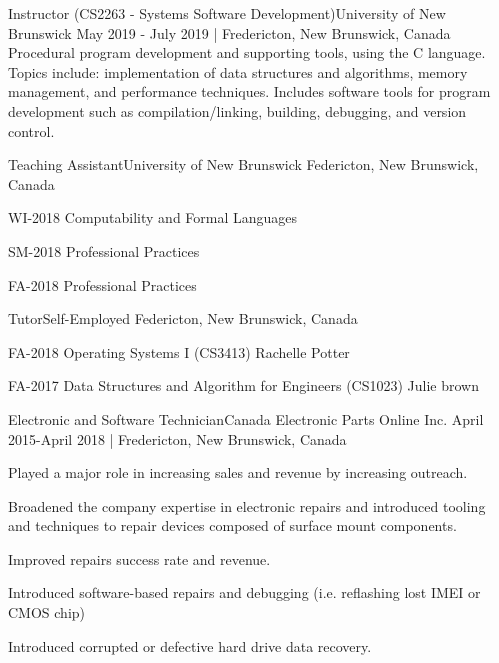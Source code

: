 \documentclass[english,letterpaper,12pt]{deedy-resume-openfont}
\begin{document}




    \employement%
        {Instructor (CS2263 - Systems Software Development)}{University of New Brunswick}
        {May 2019 - July 2019 | Fredericton, New Brunswick, Canada}{%
        Procedural program development and supporting tools, using the C language. 
        Topics include: implementation of data structures and algorithms, memory management, and performance techniques. 
        Includes software tools for program development such as compilation/linking, building, debugging, and version control.
        }

    \employement%
        {Teaching Assistant}{University of New Brunswick}
        {Federicton, New Brunswick, Canada}{%
        \begin{tightemize}
        \item WI-2018 Computability and Formal Languages
        \item SM-2018 Professional Practices
        \item FA-2018 Professional Practices
        \end{tightemize}
        }

    \employement%
        {Tutor}{Self-Employed}
        {Federicton, New Brunswick, Canada}{%
        \begin{tightemize}
        \item FA-2018 Operating Systems I (CS3413) Rachelle Potter
        \item FA-2017 Data Structures and Algorithm for Engineers (CS1023) Julie brown
        \end{tightemize}
        }

    \employement%
        {Electronic and Software Technician}{Canada Electronic Parts Online Inc.}
        {April 2015-April 2018 | Fredericton, New Brunswick, Canada}{%
        \begin{tightemize}
        \item Played a major role in increasing sales and revenue by increasing outreach.
        \item Broadened the company expertise in electronic repairs and introduced tooling and techniques to repair devices composed of surface mount components.
        \item Improved repairs success rate and revenue.
        \item Introduced software-based repairs and debugging (i.e. reflashing lost IMEI or CMOS chip)
        \item Introduced corrupted or defective hard drive data recovery.
        \end{tightemize}
        }
\end{document}
